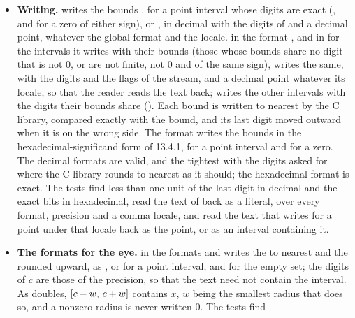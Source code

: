 \documentclass[12pt,a4paper,twoside,openright]{book}
\begin{document}
\begin{itemize}
  meet); they check ,  and  as
  masks of the states, the converse state when the operands are exchanged,
  the 48 cases of ITF1788 without decorations, and the same state with a
  mode that flushes the subnormals to zero.
\item[$\bullet$] \textbf{Writing.} 
  writes the bounds \code{[l, r]}, \code{[a]} for a point interval whose
  digits are exact (\code{[4]}, and \code{[0]} for a zero of either sign),
  or \code{[empty]}, in decimal with the digits of
   and a decimal point, whatever the global
  format and the locale.\newinvfive{}  in the format
  , and in  for the intervals it writes
  with their bounds (those whose bounds share no digit that is not $0$, or
  are not finite, not $0$ and of the same sign), writes the same, with the
  digits and the flags of the stream, and a decimal point whatever its
  locale, so that the reader reads the text back; 
  writes the other intervals with the digits their bounds share
  (). Each bound is written to nearest by the C
  library, compared exactly with the bound, and its last digit moved
  outward when it is on the wrong side. The format  writes
  the bounds in the hexadecimal-significand form of 13.4.1, \code{[a]} for
  a point interval and \code{[0x0p+0]} for a zero. The decimal formats are
  valid, and the tightest with the digits asked for where the C library
  rounds to nearest as it should; the hexadecimal format is exact. The
  tests find less than one unit of the last digit in decimal and the exact
  bits in hexadecimal, read the text of  back as a
  literal, over every format, precision and a comma locale, and read the
  text that  writes for a point under that locale back
  as the point, or as an interval containing it.
\item[$\bullet$] \textbf{The formats for the eye.}  in
  the formats  and  writes the
   to nearest and the  rounded
  upward,\newinvfive{} as , or  for a point
  interval, and \code{[empty]} for the empty set; the digits of $c$ are
  those of the precision, so that the text need not contain the interval.
  As doubles, $[c-w,\,c+w]$ contains $x$, $w$ being the smallest radius
  that does so, and a nonzero radius is never written $0$. The tests find

\end{itemize}
\end{document}
